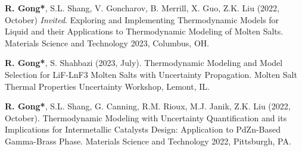 
\begin{etaremune}

\item \textbf{R. Gong*}, S.L. Shang, V. Goncharov, B. Merrill, X. Guo, Z.K. Liu
(2022, October) \emph{Invited}.
Exploring and Implementing Thermodynamic Models for Liquid and their Applications to Thermodynamic Modeling of Molten Salts. 
Materials Science and Technology 2023,
Columbus, OH.
\item \textbf{R. Gong*}, S. Shahbazi
(2023, July).
Thermodynamic Modeling and Model Selection for LiF-LnF3 Molten Salts with Uncertainty Propagation.
Molten Salt Thermal Properties Uncertainty Workshop,
Lemont, IL.
\item \textbf{R. Gong*}, S.L. Shang, G. Canning, R.M. Rioux, M.J. Janik, Z.K. Liu
(2022, October).
Thermodynamic Modeling with Uncertainty Quantification and its Implications for Intermetallic Catalysts Design: Application to PdZn-Based Gamma-Brass Phase.
Materials Science and Technology 2022,
Pittsburgh, PA.

\end{etaremune}
\vspace{-0.6em}
\vspace{0.4em}